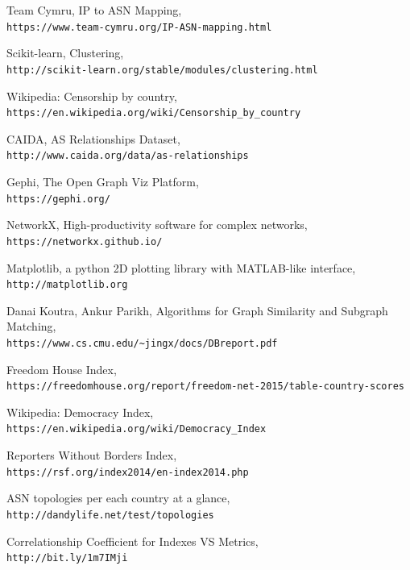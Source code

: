 \documentclass{article}
\begin{document}
\begin{thebibliography}{9}
Team Cymru, IP to ASN Mapping,
\\\texttt{https://www.team-cymru.org/IP-ASN-mapping.html}
 
Scikit-learn, Clustering,
\\\texttt{http://scikit-learn.org/stable/modules/clustering.html}
 
Wikipedia: Censorship by country,
\\\texttt{https://en.wikipedia.org/wiki/Censorship\_by\_country}

CAIDA, AS Relationships Dataset,
\\\texttt{http://www.caida.org/data/as-relationships}

Gephi, The Open Graph Viz Platform,
\\\texttt{https://gephi.org/}

NetworkX, High-productivity software for complex networks,
\\\texttt{https://networkx.github.io/}

Matplotlib, a python 2D plotting library with MATLAB-like interface,
\\\texttt{http://matplotlib.org}

Danai Koutra, Ankur Parikh, Algorithms for Graph Similarity and Subgraph Matching,
\\\texttt{https://www.cs.cmu.edu/\~{}jingx/docs/DBreport.pdf​}

Freedom House Index,
\\\texttt{https://freedomhouse.org/report/freedom-net-2015/table-country-scores}

Wikipedia: Democracy Index,
\\\texttt{https://en.wikipedia.org/wiki/Democracy\_Index}

Reporters Without Borders Index,
\\\texttt{https://rsf.org/index2014/en-index2014.php}

ASN topologies per each country at a glance,
\\\texttt{http://dandylife.net/test/topologies}

Correlationship Coefficient for Indexes VS Metrics,
\\\texttt{http://bit.ly/1m7IMji}

\end{thebibliography}
\end{document}
